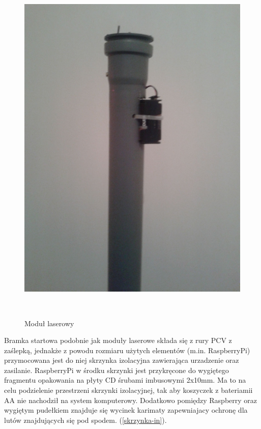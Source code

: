 \documentclass[11pt,a4paper, twoside]{article}
\begin{document}
\begin{figure}[H]
\begin{center}
\includegraphics[scale=0.10]{./img/laser1.jpg}
\caption{Moduł laserowy}
$\label{laser-1}$
\end{center}
\end{figure}
\newpage
Bramka startowa podobnie jak moduły laserowe składa się z rury PCV z zaślepką, jednakże z powodu rozmiaru użytych elementów (m.in. RaspberryPi) przymocowana jest do niej skrzynka izolacyjna zawierająca urzadzenie oraz zasilanie. RaspberryPi w środku skrzynki jest przykręcone do wygiętego fragmentu opakowania na płyty CD śrubami imbusowymi 2x10mm. Ma to na celu podzielenie przestrzeni skrzynki izolacyjnej, tak aby koszyczek z bateriamii AA nie nachodził na system komputerowy. Dodatkowo pomiędzy Raspberry oraz wygiętym pudełkiem znajduje się wycinek karimaty zapewniajacy ochronę dla lutów znajdujących się pod spodem. (\ref{skrzynka-in}).
\end{document}
